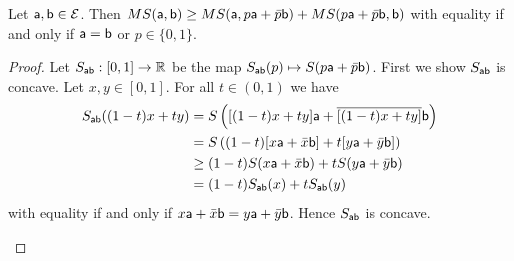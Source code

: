 \begin{mathSection}
	
\begin{prop}\label{pm-es-mixingEntropyIntervalBound}
	Let $\ens[a],\ens[b] \in \Ens$. Then $MS(\ens[a],\ens[b]) \ge MS(\ens[a],p\ens[a]+\bar{p}\ens[b])+MS(p\ens[a]+\bar{p}\ens[b],\ens[b])$ with equality if and only if $\ens[a]=\ens[b]$ or $p \in \{0,1\}$.
\end{prop}
	
\begin{proof}
	Let $S_{\ens[a]\ens[b]}:[0,1] \to \mathbb{R}$ be the map $S_{\ens[a]\ens[b]}(p) \mapsto S(p\ens[a]+\bar{p}\ens[b])$. First we show $S_{\ens[a]\ens[b]}$ is concave. Let $x,y \in [0,1]$. For all $t \in (0,1)$ we have
	\begin{equation}
		\begin{aligned}
			S_{\ens[a]\ens[b]}((1-t)x+ty) &= S\left([(1-t)x+ty]\ens[a] + \overline{[(1-t)x + ty]}\ens[b]\right) \\
			&= S\left((1-t)[x\ens[a]+\bar{x}\ens[b]]+t[y\ens[a]+\bar{y}\ens[b]]\right) \\
			&\ge (1-t)S(x\ens[a]+\bar{x}\ens[b]) + tS(y\ens[a]+\bar{y}\ens[b]) \\
			&= (1-t)S_{\ens[a]\ens[b]}(x)+tS_{\ens[a]\ens[b]}(y)
		\end{aligned}
	\end{equation}
	with equality if and only if $x\ens[a]+\bar{x}\ens[b] = y\ens[a]+\bar{y} \ens[b]$. Hence $S_{\ens[a]\ens[b]}$ is concave.
	
	\begin{figure}[H]
		\centering
	\end{figure}
	

\end{proof}
\end{mathSection}
